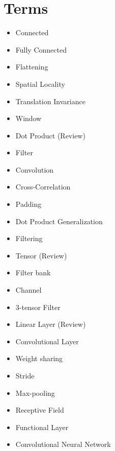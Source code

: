         

        
        

        

        

    

        

        \pagebreak

\section{Terms}

    \begin{itemize}
        \item Connected
        \item Fully Connected 
        \item Flattening
        \item Spatial Locality
        \item Translation Invariance
        \item Window
        \item Dot Product (Review)
        \item Filter
        \item Convolution
        \item Cross-Correlation
        \item Padding
        \item Dot Product Generalization
        \item Filtering
        \item Tensor (Review)
        \item Filter bank
        \item Channel
        \item 3-tensor Filter
        \item Linear Layer (Review)
        \item Convolutional Layer
        \item Weight sharing
        \item Stride
        \item Max-pooling
        \item Receptive Field
        \item Functional Layer
        \item Convolutional Neural Network
    \end{itemize}
    







